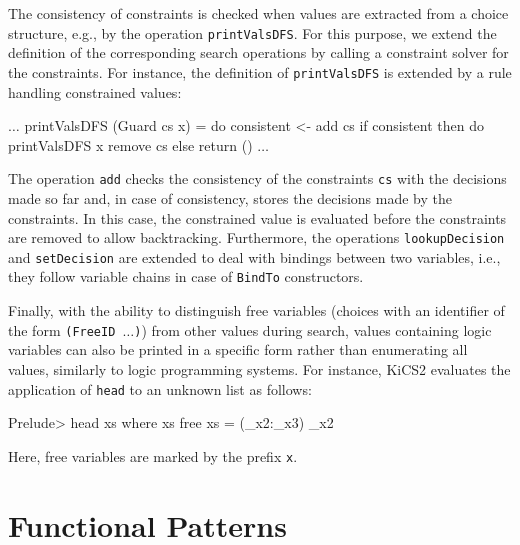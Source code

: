 \documentclass{llncs}
\newcommand{\code}[1]{\mbox{\small\texttt{#1}}}
\newcommand{\us}{\char95\xspace} %
\begin{document}
%
The consistency of constraints is checked when values are extracted
from a choice structure, e.g., by the operation \code{printValsDFS}.
For this purpose, we extend the definition of the corresponding search
operations by calling a constraint solver for the constraints.
For instance, the definition of \code{printValsDFS} is extended by
a rule handling constrained values:
%
\begin{haskell}
  $\ldots$
  printValsDFS (Guard cs x) = do consistent <- add cs
                                 if consistent then do printValsDFS x
                                                       remove cs
                                               else return ()
  $\ldots$
\end{haskell}
The operation \code{add} checks the consistency of the constraints \code{cs}
with the decisions made so far and, in case of consistency,
stores the decisions made by the constraints.
In this case, the constrained value is evaluated
before the constraints are removed to allow backtracking.
Furthermore, the operations \code{lookupDecision} and \code{setDecision}
are extended to deal with bindings between two variables,
i.e., they follow variable chains in case of \code{BindTo} constructors.

Finally, with the ability to distinguish free variables 
(choices with an identifier of the form \code{(FreeID $\ldots$)})
from other values during search, values containing logic variables 
can also be printed in a specific form rather than enumerating all values, 
similarly to logic programming systems. For instance, KiCS2 evaluates the 
application of \code{head} to an unknown list as follows:
\begin{haskell}
  Prelude> head xs where xs free
  {xs = (_x2:_x3)} _x2
\end{haskell}
Here, free variables are marked by the prefix \code{\us{}x}.



\section{Functional Patterns}
\label{sec:FuncPatterns}
\end{document}
